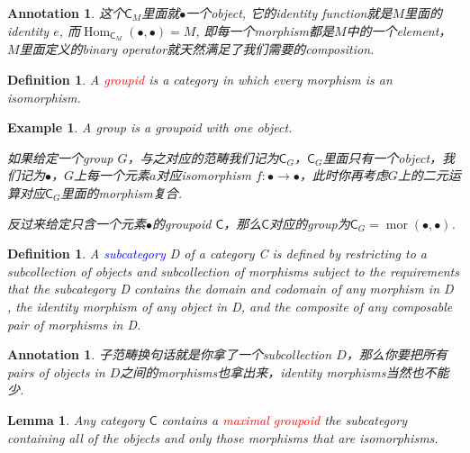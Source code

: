 \documentclass{article}
\newtheorem{lemma}[theorem]{Lemma}
\newtheorem{example}[theorem]{Example}
\newtheorem{definition}[theorem]{Definition}
\newtheorem{annotation}[theorem]{Annotation}
\newcommand*{\cat}[1]{\textsf{#1}\xspace}
\newcommand*{\xfunc}[4]{{#2}\colon{#3}{#1}{#4}}
\newcommand*{\func}[3]{\xfunc{\to}{#1}{#2}{#3}}
\DeclareMathOperator{\mor}{mor}
\DeclareMathOperator{\Hom}{Hom}
\newcommand{\redt}[1]{\textcolor{red}{#1}}
\newcommand{\bluet}[1]{\textcolor{blue}{#1}}
\begin{document}
\begin{annotation}
\rm 这个$\cat{C}_M$里面就$\bullet$一个object, 它的identity function就是$M$里面的identity $e$, 而$\Hom_{\cat{C}_M}(\bullet,\bullet) = M$, 即每一个morphism都是$M$中的一个element， $M$里面定义的binary operator就天然满足了我们需要的composition. 
\end{annotation}


\begin{definition}
\rm A \redt{groupid} is a category in which every morphism  is an isomorphism. 
\end{definition}

\begin{example}
\rm A group is a groupoid with one object. 

如果给定一个group $G$，与之对应的范畴我们记为$\cat{C}_G$，$\cat{C}_G$里面只有一个object，我们记为$\bullet$，$G$上每一个元素$a$对应isomorphism $\func{f}{\bullet}{\bullet}$，此时你再考虑$G$上的二元运算对应$\cat{C}_G$里面的morphism复合. 

反过来给定只含一个元素$\bullet$的groupoid $\cat{C}$，那么$\cat{C}$对应的group为$\cat{C}_G = \mor(\bullet,\bullet)$. 
\end{example}



\begin{definition}
\rm A \bluet{subcategory} D of a category C is defined by restricting to a subcollection of objects and subcollection of morphisms subject to the requirements that the subcategory D contains
the domain and codomain of any morphism in D , the identity morphism of any object in D, and the composite of any composable pair of morphisms in D.
\end{definition}

\begin{annotation}
\rm 子范畴换句话就是你拿了一个subcollection $D$，那么你要把所有pairs of objects in $D$之间的morphisms也拿出来，identity morphisms当然也不能少. 
\end{annotation}

\begin{lemma}
\rm Any category $\cat{C}$ contains a \redt{maximal groupoid} the subcategory containing all of the objects and only those morphisms that are isomorphisms. 
\end{lemma}
\end{document}
